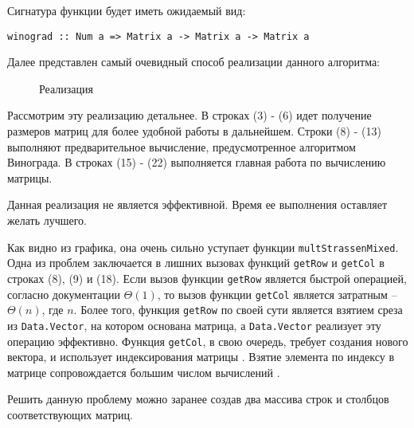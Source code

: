 \documentclass[a4paper,12pt,russian]{article}
\begin{document}
	Сигнатура функции будет иметь ожидаемый вид:
	
	\begin{lstlisting} 
winograd :: Num a => Matrix a -> Matrix a -> Matrix a
	\end{lstlisting}
	
	Далее представлен самый очевидный способ реализации данного алгоритма:
	
	\begin{figure}[H]
		\caption{Реализация}
		
	\end{figure}
	
	Рассмотрим эту реализацию детальнее. В строках (3) - (6) идет получение размеров матриц для более удобной работы в дальнейшем. Строки (8) - (13) выполняют предварительное вычисление, предусмотренное алгоритмом Винограда. В строках (15) - (22) выполняется главная работа по вычислению матрицы.
	
	Данная реализация не является эффективной. Время ее выполнения оставляет желать лучшего.
	
	
	Как видно из графика, она очень сильно уступает функции \texttt{multStrassenMixed}. Одна из проблем заключается в лишних вызовах функций \texttt{getRow} и \texttt{getCol} в строках (8), (9) и (18). Если вызов функции \texttt{getRow} является быстрой операцией, согласно документации \(\Theta(1)\), то вызов функции \texttt{getCol} является затратным -- \(\Theta(n)\), где \(n\). Более того, функция \texttt{getRow} по своей сути является взятием среза из \texttt{Data.Vector}, на котором основана матрица, а \texttt{Data.Vector} реализует эту операцию эффективно. Функция \texttt{getCol}, в свою очередь, требует создания нового вектора, и использует индексирования матрицы \cite{data.matrix}. Взятие элемента по индексу в матрице сопровождается большим числом вычислений \cite{data.vector}.
	
	Решить данную проблему можно заранее создав два массива строк и столбцов соответствующих матриц.
	
\end{document}
